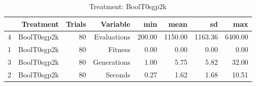 \begin{table}[ht]
\centering
\begin{tabular}{rrrrrrrr}
  \hline
 & Treatment & Trials & Variable & min & mean & sd & max \\ 
  \hline
4 & BoolT0sgp2k &  80 & Evaluations & 200.00 & 1150.00 & 1163.36 & 6400.00 \\ 
  1 & BoolT0sgp2k &  80 & Fitness & 0.00 & 0.00 & 0.00 & 0.00 \\ 
  3 & BoolT0sgp2k &  80 & Generations & 1.00 & 5.75 & 5.82 & 32.00 \\ 
  2 & BoolT0sgp2k &  80 & Seconds & 0.27 & 1.62 & 1.68 & 10.51 \\ 
   \hline
\end{tabular}
\caption{Treatment: BoolT0sgp2k} 
\end{table}
